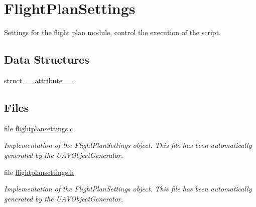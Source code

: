 \hypertarget{group___flight_plan_settings}{\section{\-Flight\-Plan\-Settings}
\label{group___flight_plan_settings}
}


\-Settings for the flight plan module, control the execution of the script.  


\subsection*{\-Data \-Structures}
\begin{DoxyCompactItemize}
\item 
struct \hyperlink{struct____attribute____}{\-\_\-\-\_\-attribute\-\_\-\-\_\-}
\end{DoxyCompactItemize}
\subsection*{\-Files}
\begin{DoxyCompactItemize}
\item 
file \hyperlink{flightplansettings_8c}{flightplansettings.\-c}
\begin{DoxyCompactList}\small\item\em \-Implementation of the \-Flight\-Plan\-Settings object. \-This file has been automatically generated by the \-U\-A\-V\-Object\-Generator. \end{DoxyCompactList}\item 
file \hyperlink{flightplansettings_8h}{flightplansettings.\-h}
\begin{DoxyCompactList}\small\item\em \-Implementation of the \-Flight\-Plan\-Settings object. \-This file has been automatically generated by the \-U\-A\-V\-Object\-Generator. \end{DoxyCompactList}\end{DoxyCompactItemize}
